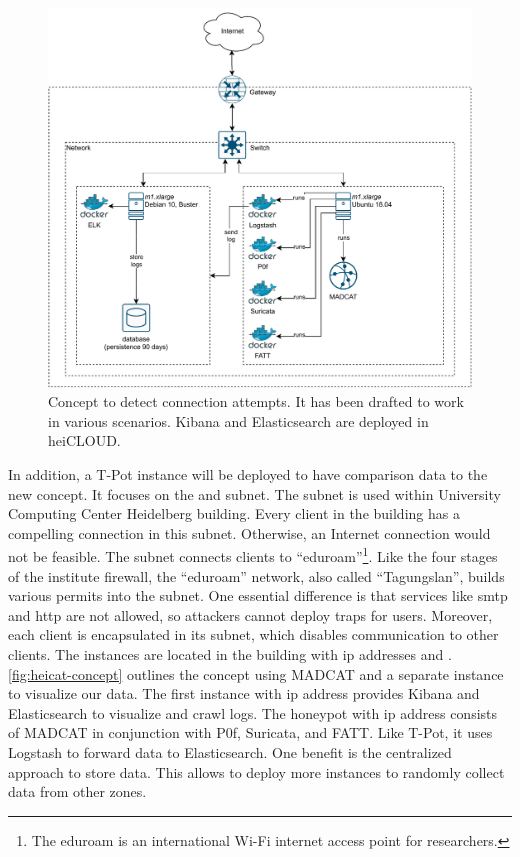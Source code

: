 \begin{figure}[htbp]
    \centering
    \includegraphics[width=\textwidth]{figures/heicat-concept.pdf}
    \caption[Concept to detect connection attempts]{
        Concept to detect connection attempts.
        It has been drafted to work in various scenarios.
        Kibana and Elasticsearch are deployed in heiCLOUD.
    }
    \label{fig:heicat-concept}
\end{figure}

In addition, a T-Pot instance will be deployed to have comparison data to the new concept.
It focuses on the  and  subnet.
The  subnet is used within University Computing Center Heidelberg building.
Every client in the building has a compelling connection in this subnet.
Otherwise, an Internet connection would not be feasible.
The subnet  connects clients to \enquote{eduroam}\footnote{The eduroam is an international Wi-Fi internet access point for researchers.}.
Like the four stages of the institute firewall, the \enquote{eduroam} network, also called \enquote{Tagungslan}, builds various permits into the subnet.
One essential difference is that services like \ac{smtp} and \ac{http} are not allowed, so attackers cannot deploy traps for users.
Moreover, each client is encapsulated in its subnet, which disables communication to other clients.
The instances are located in the building with \ac{ip} addresses  and .
\autoref{fig:heicat-concept} outlines the concept using MADCAT and a separate instance to visualize our data.
The first instance with \ac{ip} address  provides Kibana and Elasticsearch to visualize and crawl logs.
The honeypot with \ac{ip} address  consists of MADCAT in conjunction with P0f, Suricata, and FATT.
Like T-Pot, it uses Logstash to forward data to Elasticsearch.
One benefit is the centralized approach to store data.
This allows to deploy more instances to randomly collect data from other zones.

